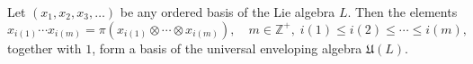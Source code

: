 Let $(x_1, x_2, x_3, \ldots)$ be any ordered basis of the Lie algebra $L$. Then the elements
$$x_{i(1)} \cdots x_{i(m)} = \pi(x_{i(1)} \otimes \cdots \otimes x_{i(m)}), \quad m \in \mathbb{Z}^+, \; i(1) \leq i(2) \leq \cdots \leq i(m),$$
together with $1$, form a basis of the universal enveloping algebra $\mathfrak{U}(L)$.
